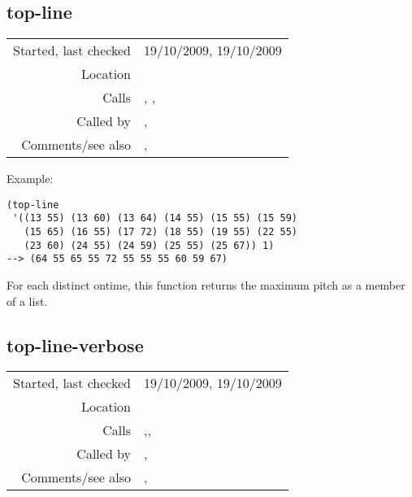 \subsection*{top-line}\label{fun:top-line}

\vspace{0.3cm}
\begin{tabular}{r|p{8cm}}
Started, last checked & 19/10/2009, 19/10/2009 \\
Location & \nameref{sec:musical-properties} \\
Calls & \nameref{fun:cons-ith-while-jth-constantp}, \nameref{fun:max-item},\newline \nameref{fun:restn} \\
Called by & \nameref{fun:intervallic-leaps}, \nameref{fun:small-intervals} \\
Comments/see also & \nameref{fun:sky-line-clipped}, \nameref{fun:top-line-verbose}
\end{tabular}

\vspace{0.5cm}
\noindent Example:
\begin{verbatim}
(top-line
 '((13 55) (13 60) (13 64) (14 55) (15 55) (15 59)
   (15 65) (16 55) (17 72) (18 55) (19 55) (22 55)
   (23 60) (24 55) (24 59) (25 55) (25 67)) 1)
--> (64 55 65 55 72 55 55 55 60 59 67)
\end{verbatim}

\noindent For each distinct ontime, this function
returns the maximum pitch as a member of a list.


\subsection*{top-line-verbose}\label{fun:top-line-verbose}

\vspace{0.3cm}
\begin{tabular}{r|p{8cm}}
Started, last checked & 19/10/2009, 19/10/2009 \\
Location & \nameref{sec:musical-properties} \\
Calls & \nameref{fun:cons-ith-while-jth-constantp},\newline \nameref{fun:max-nth-argmax}, \nameref{fun:restn} \\
Called by & \nameref{fun:intervallic-leaps}, \nameref{fun:small-intervals} \\
Comments/see also & \nameref{fun:sky-line-clipped}, \nameref{fun:top-line}
\end{tabular}

